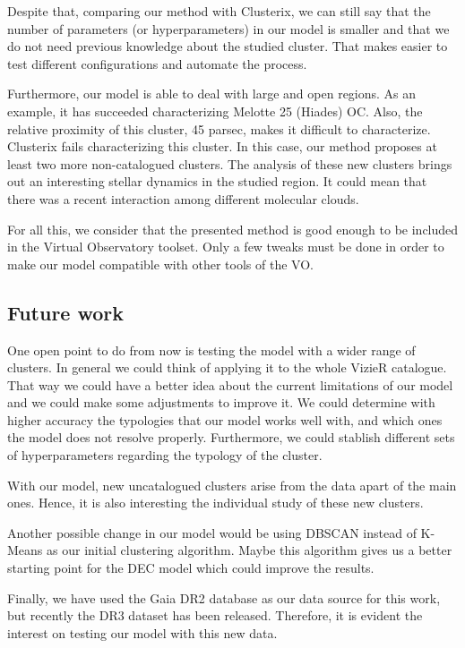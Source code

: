 \documentclass[11pt,a4paper,english,twocolumn]{article}
\begin{document}
Despite that, comparing our method with Clusterix, we can still say that the
number of parameters (or hyperparameters) in our model is smaller and that
we do not need previous knowledge about the studied cluster.
That makes easier to test different configurations and automate the process.

Furthermore, our model is able to deal with large and open regions. As an example,
it has succeeded characterizing Melotte 25 (Hiades) OC. Also, the relative proximity
of this cluster, 45 parsec, makes it difficult to characterize. Clusterix fails
characterizing this cluster. In this case, our method proposes at least two more
non-catalogued clusters. The analysis of these new clusters brings out an interesting
stellar dynamics in the studied region. It could mean that there was a recent
interaction among different molecular clouds.

For all this, we consider that the presented method is good enough to be included
in the Virtual Observatory toolset. Only a few tweaks must be done in order to make
our model compatible with other tools of the VO.

\subsection{Future work}

One open point to do from now is testing the model with a wider range of clusters.
In general we could think of applying it to the whole VizieR catalogue.
That way we could have a better idea about the current limitations of our model
and we could make some adjustments to improve it. We could determine with higher
accuracy the typologies that our model works well with, and which ones the model
does not resolve properly. Furthermore, we could stablish different sets of
hyperparameters regarding the typology of the cluster.

With our model, new uncatalogued clusters arise from the data apart of the main ones.
Hence, it is also interesting the individual study of these new clusters.

Another possible change in our model would be using DBSCAN instead of K-Means
as our initial clustering algorithm. Maybe this algorithm gives us a better starting
point for the DEC model which could improve the results.

Finally, we have used the Gaia DR2 database as our data source for this work,
but recently the DR3 dataset has been released.
Therefore, it is evident the interest on testing our model with this new data.
\end{document}
